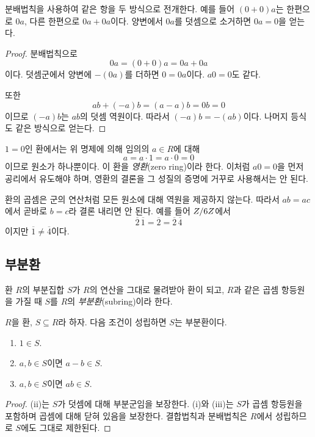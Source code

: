 \begin{proofidea}
분배법칙을 사용하여 같은 항을 두 방식으로 전개한다. 예를 들어 $(0+0)a$는 한편으로 $0a$, 다른 한편으로 $0a+0a$이다. 양변에서 $0a$를 덧셈으로 소거하면 $0a=0$을 얻는다.
\end{proofidea}

\begin{proof}
분배법칙으로
\[
  0a=(0+0)a=0a+0a
\]
이다. 덧셈군에서 양변에 $-(0a)$를 더하면 $0=0a$이다. $a0=0$도 같다.

또한
\[
  ab+(-a)b=(a-a)b=0b=0
\]
이므로 $(-a)b$는 $ab$의 덧셈 역원이다. 따라서 $(-a)b=-(ab)$이다. 나머지 등식도 같은 방식으로 얻는다.
\end{proof}

$1=0$인 환에서는 위 명제에 의해 임의의 $a\in R$에 대해
\[
  a=a\cdot1=a\cdot0=0
\]
이므로 원소가 하나뿐이다. 이 환을 \emph{영환}(zero ring)이라 한다. 이처럼 $a0=0$을 먼저 공리에서 유도해야 하며, 영환의 결론을 그 성질의 증명에 거꾸로 사용해서는 안 된다.

\begin{pitfall}
환의 곱셈은 군의 연산처럼 모든 원소에 대해 역원을 제공하지 않는다. 따라서 $ab=ac$에서 곧바로 $b=c$라 결론 내리면 안 된다. 예를 들어 $Z/6Z$에서
\[
  \overline2\,\overline1=\overline2=\overline2\,\overline4
\]
이지만 $\overline1\ne\overline4$이다.
\end{pitfall}

\subsection{부분환}

\begin{definition}[부분환]
환 $R$의 부분집합 $S$가 $R$의 연산을 그대로 물려받아 환이 되고, $R$과 같은 곱셈 항등원을 가질 때 $S$를 $R$의 \emph{부분환}(subring)이라 한다.
\end{definition}

\begin{proposition}
$R$을 환, $S\subseteq R$라 하자. 다음 조건이 성립하면 $S$는 부분환이다.
\begin{enumerate}[label=(\roman*)]
  \item $1\in S$.
  \item $a,b\in S$이면 $a-b\in S$.
  \item $a,b\in S$이면 $ab\in S$.
\end{enumerate}
\end{proposition}

\begin{proof}
(ii)는 $S$가 덧셈에 대해 부분군임을 보장한다. (i)와 (iii)는 $S$가 곱셈 항등원을 포함하며 곱셈에 대해 닫혀 있음을 보장한다. 결합법칙과 분배법칙은 $R$에서 성립하므로 $S$에도 그대로 제한된다.
\end{proof}

